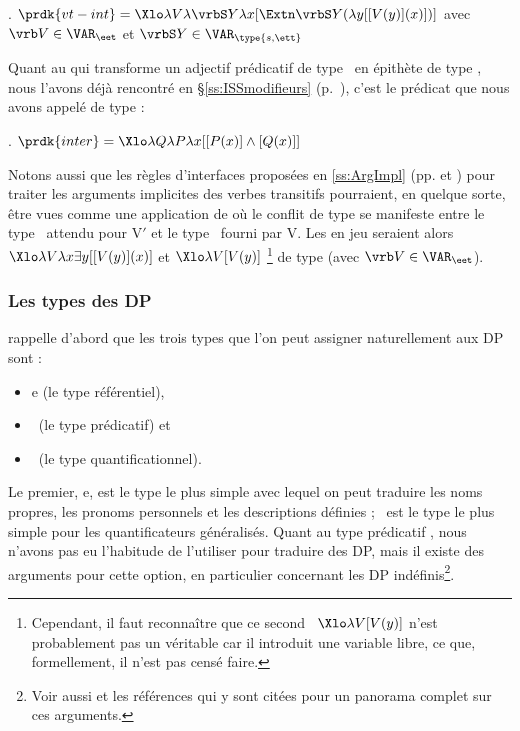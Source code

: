 \fussy

\ex.
\(\prdk{vt-int} = \Xlo\lambda V\lambda\vrbS Y\lambda x[\Extn\vrbS Y(\lambda y[[V(y)](x)])]\)
avec $\vrb V\in \VAR_{\eet}$ et $\vrbS Y\in\VAR_{\type{s,\ett}}$


Quant au  qui transforme un adjectif prédicatif de type \et\ en épithète de type \type{\et,\et}, nous l'avons déjà rencontré en 
\S\ref{ss:ISSmodifieurs} (p.~\pageref{HINTER}), c'est le prédicat que nous avons appelé  de type \type{\et,\type{\et,\et}} :

\ex.
\(\prdk{inter} = \Xlo\lambda Q\lambda P\lambda x [[P(x)]\wedge[Q(x)]]\)



Notons aussi 
que les règles d'interfaces proposées en \ref{ss:ArgImpl} (pp. \pageref{ri:VTabs} et \pageref{ri:VTa0}) pour traiter les arguments implicites des verbes transitifs pourraient, en quelque sorte, être vues comme une application de  où le conflit de type se manifeste entre le type \et\ attendu pour V$'$ et le type \eet\ fourni par V.  Les  en jeu seraient alors $\Xlo\lambda V\lambda x\exists y[[V(y)](x)]$ et $\Xlo\lambda V[V(y)]$%
\footnote{Cependant, il faut reconnaître que ce second \lterme\ $\Xlo\lambda V[V(y)]$ n'est probablement pas un véritable  car il introduit une variable libre, ce que, formellement, il n'est pas censé faire.} 
de type \type{\eet,\et} (avec $\vrb V \in\VAR_{\eet}$).





\subsubsection{Les types des DP}

\citet{Partee:87} rappelle d'abord
que les trois types que l'on peut assigner naturellement aux DP sont :

\begin{itemize}
\item \typ e (le type référentiel), 
\item \et\ (le type prédicatif) et 
\item \ett\ (le type quantificationnel).  
\end{itemize}

Le premier, \typ e, est le type le plus simple avec lequel on peut traduire les noms propres, les pronoms personnels et les descriptions définies ; \ett\ est le type le plus simple pour les quantificateurs généralisés.
Quant au type prédicatif \et, nous n'avons pas eu l'habitude de l'utiliser pour traduire des DP, mais il existe des arguments pour cette option, en particulier concernant les DP indéfinis\footnote{Voir aussi \citet{SorinBeyssade:05} et les références qui y sont citées pour un panorama complet sur ces arguments.}.

